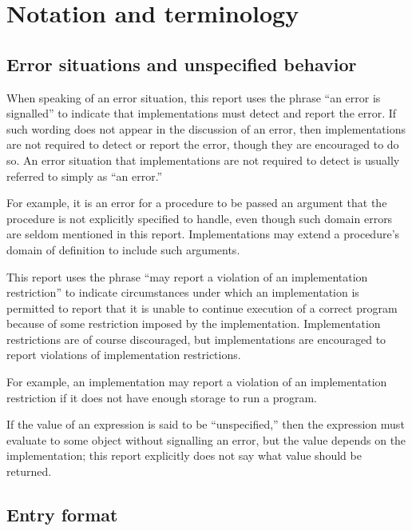 \chapter{Notation and terminology}

\section{Error situations and unspecified behavior}

When speaking of an error situation, this report uses the phrase ``an
error is signalled'' to indicate that implementations must detect and
report the error.  If such wording does not appear in the discussion of
an error, then implementations are not required to detect or report the
error, though they are encouraged to do so.  An error situation that
implementations are not required to detect is usually referred to simply
as ``an error.''

\vest For example, it is an error for a procedure to be passed an argument that
the procedure is not explicitly specified to handle, even though such
domain errors are seldom mentioned in this report.  Implementations may
extend a procedure's domain of definition to include such arguments.

\vest This report uses the phrase ``may report a violation of an
implementation restriction'' to indicate circumstances under which an
implementation is permitted to report that it is unable to continue
execution of a correct program because of some restriction imposed by the
implementation.  Implementation restrictions are of course discouraged,
but implementations are encouraged to report violations of implementation
restrictions.

\vest For example, an implementation may report a violation of an
implementation restriction if it does not have enough storage to run a
program.

\vest If the value of an expression is said to be ``unspecified,'' then
the expression must evaluate to some object without signalling an error,
but the value depends on the implementation; this report explicitly does
not say what value should be returned. 




\section{Entry format}

